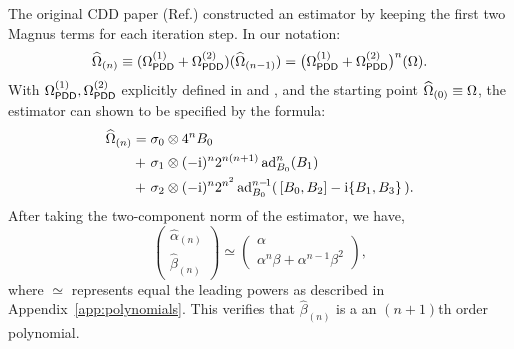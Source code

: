\documentclass[twocolumn,pra,superscriptaddress]{revtex4-2}
\newcommand{\Opdd}{\Omega_{\mathsf{PDD}}}
\begin{document}
{The original CDD paper (Ref.\cite{khodjasteh2005fault}) constructed an estimator by keeping the first two Magnus terms for each iteration step. In
our notation:
\begin{equation}
    \Ohat_{(n)} \equiv (\Opdd\up{1} + \Opdd\up{2}) (\Ohat_{(n-1)}) = \big(\Opdd\up{1} + \Opdd\up{2}\big)^n (\Omega).
\end{equation}
With $\Opdd\up{1}, \Opdd\up{2}$ explicitly defined in  and , and the starting point $\widehat{\Omega}_{(0)}\equiv\Omega$,  the estimator can shown to be specified by the formula:
\begin{align}\label{eq:cdd-estimator}
\widehat{\Omega}_{(n)} 
={} & \sigma_0 \otimes 4^n B_0 \notag \\
+\ & \sigma_1 \otimes (-\mathrm{i})^{n} 2^{n(n+1)} \operatorname{ad}_{B_0}^{n}(B_1)\\ 
+\ & \sigma_2 \otimes (-\mathrm{i})^{n} 2^{n^2} \operatorname{ad}_{B_0}^{n-\!1}( \,[B_0,B_2] - \mathrm{i} \{B_1,B_3\} \,). \notag
\end{align} 
After taking the two-component norm of the estimator, we have,
\begin{equation}
\begin{pmatrix}
\widehat\alpha_{(n)}\\
\widehat\beta_{(n)}
\end{pmatrix}
\simeq
\begin{pmatrix}
\alpha\\
\alpha^{n} \beta +\alpha^{n-1} \beta^2
\end{pmatrix},
\end{equation}
where $\simeq$ represents equal the leading powers as described in Appendix~\ref{app:polynomials}. 
This verifies that $\widehat\beta_{(n)}$ is a an $(n+1)$th order polynomial.

}
\end{document}
